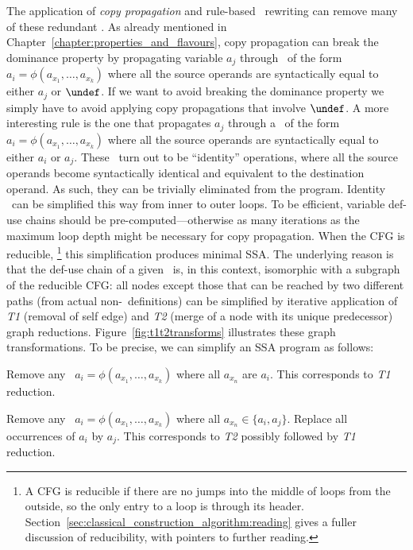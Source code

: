 {The application of \emph{copy propagation} and rule-based \phifun\ rewriting
can remove many of these redundant \phifuns. 
As already mentioned in Chapter~\ref{chapter:properties_and_flavours}, 
copy propagation can break the dominance property by propagating 
variable $a_j$ through \phifuns\ of the form $a_i=\phi(a_{x_1},\ldots,a_{x_k})$ where
all the source operands are syntactically equal to either $a_j$ or $\undef$. 
If we want to avoid breaking the dominance property we simply have to
avoid applying copy propagations that involve $\undef$. 
A more interesting rule is the one that propagates $a_j$ through a
\phifun\ of the form $a_i=\phi(a_{x_1},\ldots,a_{x_k})$ where all the source operands are
syntactically equal to either $a_i$ or $a_j$. 
These \phifuns\ turn out to be ``identity'' operations, where all the
source operands become syntactically identical and equivalent to the 
destination operand. As such, they can be trivially eliminated from the program.
Identity \phifuns\ can be simplified this way from inner to outer loops. 
To be efficient, 
variable def-use chains should be pre-computed---otherwise as many iterations 
as the maximum loop depth might be necessary for copy propagation.
When the CFG is reducible,%
\footnote{A CFG is reducible if there are no jumps into the middle of loops
from the outside, so the only entry to a loop is through its header.
Section~\ref{sec:classical_construction_algorithm:reading} 
gives a fuller discussion of reducibility, with
pointers to further reading.}
this simplification produces minimal SSA. 
The underlying reason is that the def-use chain of a given \phiweb\ is,
in this context, isomorphic with a subgraph of the reducible CFG: 
all nodes except those that can be reached by two different paths (from
actual non-\phifun\ definitions) can be simplified by iterative 
application of 
\emph{T1} (removal of self edge) and 
\emph{T2} (merge of a node with its unique predecessor) graph reductions.
Figure~\ref{fig:t1t2transforms} illustrates these graph transformations.
To be precise, we can simplify an SSA program as follows:
\begin{compactenum}
\item Remove any \phifun\ $a_i=\phi(a_{x_1},\ldots,a_{x_k})$ where all $a_{x_n}$
  are $a_i$. This corresponds to \emph{T1} reduction.
\item Remove any \phifun\ $a_i=\phi(a_{x_1},\ldots,a_{x_k})$ where all
  $a_{x_n} \in \{ a_i, a_j \}$. Replace all occurrences of $a_i$ by $a_j$.
 This corresponds to \emph{T2} possibly followed by
 \emph{T1} reduction.
\end{compactenum}

}
